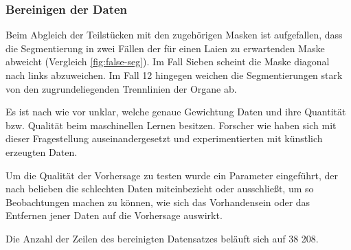 \subsubsection{Bereinigen der Daten} \label{ssec:clean-data}

Beim Abgleich der Teilstücken mit den zugehörigen Masken ist aufgefallen, dass die Segmentierung in zwei Fällen der für einen Laien zu erwartenden Maske abweicht (Vergleich \ref{fig:false-seg}). Im Fall Sieben scheint die Maske diagonal nach links abzuweichen. Im Fall 12 hingegen weichen die Segmentierungen stark von den zugrundeliegenden Trennlinien der Organe ab.

Es ist nach wie vor unklar, welche genaue Gewichtung Daten und ihre Quantität bzw. Qualität beim maschinellen Lernen besitzen. Forscher wie \citet{Souly2022} haben sich mit dieser Fragestellung auseinandergesetzt und experimentierten mit künstlich erzeugten Daten.

Um die Qualität der Vorhersage zu testen wurde ein Parameter eingeführt, der nach belieben die schlechten Daten miteinbezieht oder ausschließt, um so Beobachtungen machen zu können, wie sich das Vorhandensein oder das Entfernen jener Daten auf die Vorhersage auswirkt.

Die Anzahl der Zeilen des bereinigten Datensatzes beläuft sich auf 38 208.


